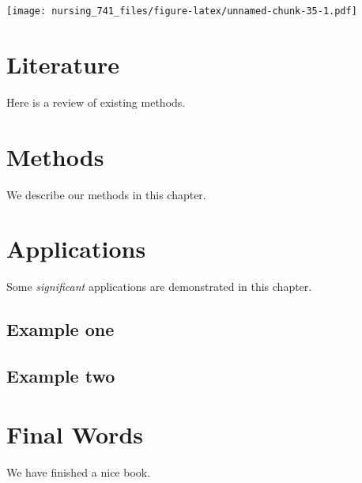 \documentclass[]{book}
\begin{document}
\texttt{[image: nursing\_741\_files/figure-latex/unnamed-chunk-35-1.pdf]}

\chapter{Literature}\label{literature}

Here is a review of existing methods.

\chapter{Methods}\label{methods}

We describe our methods in this chapter.

\chapter{Applications}\label{applications}

Some \emph{significant} applications are demonstrated in this chapter.

\section{Example one}\label{example-one}

\section{Example two}\label{example-two}

\chapter{Final Words}\label{final-words}

We have finished a nice book.


\end{document}
